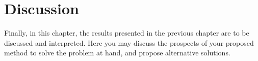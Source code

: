 \chapter{Discussion}
\label{chap:discussion}

Finally, in this chapter, the results presented in the previous chapter are to be discussed and interpreted.
Here you may discuss the prospects of your proposed method to solve the problem at hand, and propose alternative solutions.

